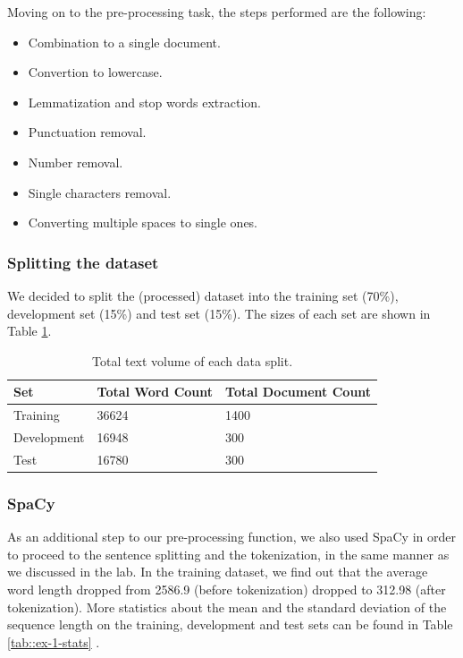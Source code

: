 \documentclass[10pt, a4paper]{article}
\begin{document}
	Moving on to the pre-processing task, the steps performed are the following:
	\begin{itemize}
		\item{ Combination to a single document.}
		\item{ Convertion to lowercase.}
		\item{Lemmatization and stop words extraction.}
		\item{ Punctuation removal.}
		\item{ Number removal.}
		\item{Single characters removal.}
		\item{ Converting multiple spaces to single ones.}
	\end{itemize}
	
	\subsubsection{Splitting the dataset}
	We decided to split the (processed) dataset into the training set (70\%), development set (15\%) and test set (15\%). The sizes of each set are shown in Table \ref{tab::ex-9-stats}.
	
	\begin{table}
		\begin{tabular}{|l|l|l|}
			\hline
			\cellcolor{blue!25}\textbf{Set} & \cellcolor{blue!25}\textbf{Total Word Count} &
			\cellcolor{blue!25}\textbf{Total Document Count}\\
			\hline
			Training & 36624 & 1400 \\\hline
			Development & 16948  & 300 \\\hline
			Test & 16780 & 300 \\\hline
		\end{tabular}
		\centering
		\caption{Total text volume of each data split.}
		\label{tab::ex-9-stats}
	\end{table}
	
	
	\subsubsection{SpaCy}
	As an additional step to our pre-processing function, we also used SpaCy in order to proceed to the sentence splitting and the tokenization, in the same manner as we discussed in the lab. In the training dataset, we find out that the average word length dropped from 2586.9 (before tokenization) dropped to 312.98 (after tokenization). More statistics about the mean and the standard deviation of the sequence length on the training, development and test sets can be found in Table \ref{tab::ex-1-stats} .
\end{document}
